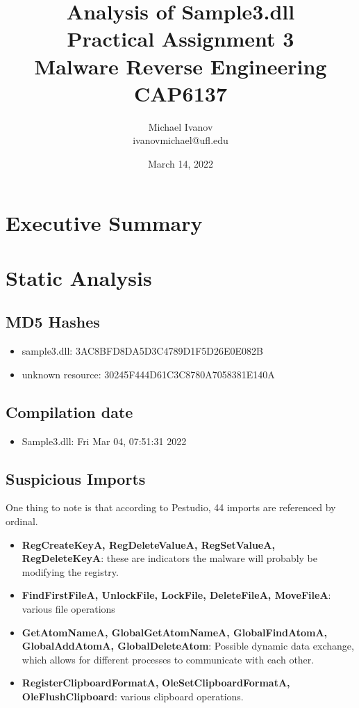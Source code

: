 \documentclass{article}
\title{Analysis of Sample3.dll \\Practical Assignment 3\\Malware Reverse Engineering \\
CAP6137}
\author{Michael Ivanov \\
ivanovmichael@ufl.edu}
\date{March 14, 2022}
\begin{document}
    \maketitle
    \pagebreak
    \section{Executive Summary}
    \pagebreak
    \section{Static Analysis}
    \subsection{MD5 Hashes}
    \begin{itemize}
        \item sample3.dll: 3AC8BFD8DA5D3C4789D1F5D26E0E082B
        \item unknown resource: 30245F444D61C3C8780A7058381E140A
    \end{itemize}
    \subsection{Compilation date}
    \begin{itemize}
        \item Sample3.dll: Fri Mar 04, 07:51:31 2022
    \end{itemize}
    \subsection{Suspicious Imports}
    One thing to note is that according to Pestudio, 44 imports are referenced by ordinal.
    \begin{itemize}
        \item \textbf{RegCreateKeyA, RegDeleteValueA, RegSetValueA, RegDeleteKeyA}: these are indicators the malware will probably be modifying the registry.
        \item \textbf{FindFirstFileA, UnlockFile, LockFile, DeleteFileA, MoveFileA}: various file operations
        \item \textbf{GetAtomNameA, GlobalGetAtomNameA, GlobalFindAtomA, GlobalAddAtomA, GlobalDeleteAtom}: Possible dynamic data exchange, which allows for different processes to communicate with each other. \cite{atom}
        \item \textbf{RegisterClipboardFormatA,} \textbf{OleSetClipboardFormatA,} \textbf{OleFlushClipboard}: various clipboard operations.
    \end{itemize}
\end{document}
